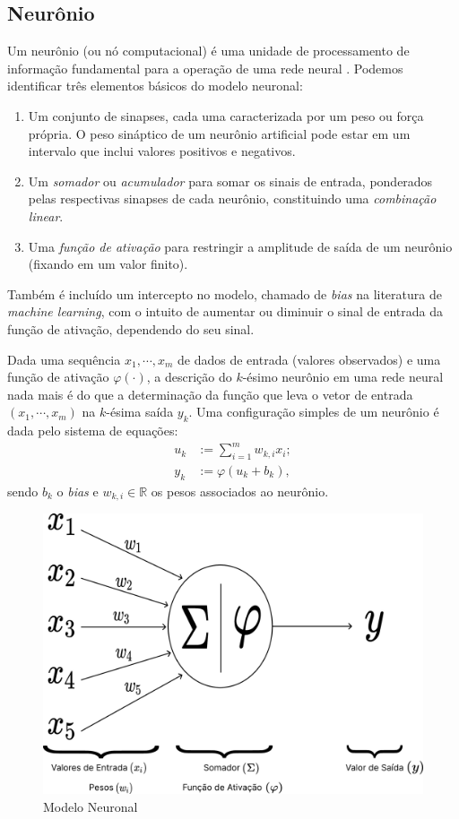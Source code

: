 \documentclass{automatextcc}
\newcommand{\R}{\mathds{R}}
\begin{document}
\subsection{Neurônio}
Um neurônio (ou nó computacional) é uma unidade de processamento de informação fundamental para a operação de uma rede neural \citep{haykin2009}. Podemos identificar três elementos básicos do modelo neuronal:
\begin{enumerate}
    \item Um conjunto de sinapses, cada uma caracterizada por um peso ou força própria. O peso sináptico de um neurônio artificial pode estar em um intervalo que inclui valores positivos e negativos.
    \item Um \textit{somador} ou \textit{acumulador} para somar os sinais de entrada, ponderados pelas respectivas sinapses de cada neurônio, constituindo uma \textit{combinação linear}.
    \item Uma \textit{função de ativação} para restringir a amplitude de saída de um neurônio (fixando em um valor finito).
\end{enumerate}
Também é incluído um intercepto no modelo, chamado de \textit{bias} na literatura de \textit{machine learning}, com o intuito de aumentar ou diminuir o sinal de entrada da função de ativação, dependendo do seu sinal.

Dada uma sequência $x_1,\cdots,x_m$ de dados de entrada (valores observados) e uma função de ativação $\varphi(\cdot)$, a descrição do $k$-ésimo neurônio em uma rede neural nada mais é do que a determinação da função que leva o vetor de entrada $(x_1,\cdots,x_m)$ na $k$-ésima saída $y_k$. Uma configuração simples de um neurônio é dada pelo sistema de equações:
\begin{align*}
    u_k & := \sum_{i=1}^{m} w_{k,i}x_i; \\   
    y_k & := \varphi(u_k + b_k),
\end{align*}
sendo $b_k$ o \textit{bias} e $w_{k,i} \in \R$ os pesos associados ao neurônio.

\begin{figure}
    \centering
    \includegraphics[width=.7\textwidth]{figuras/neuron_model.pdf}
	\caption{Modelo Neuronal \citep[adaptado de][]{haykin2001,hair2005}}
\end{figure}
\end{document}
